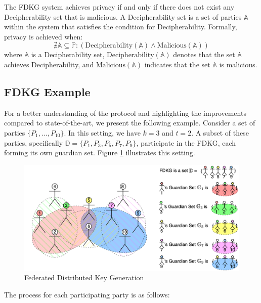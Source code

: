 \documentclass{article}
\begin{document}
\begin{definition}[Privacy] \label{def:privacy}
    The FDKG system achieves privacy if and only if there does not exist any Decipherability set that is malicious. A Decipherability set is a set of parties \( \mathbb{A} \) within the system that satisfies the condition for Decipherability. Formally, privacy is achieved when:
    \[
    \nexists \mathbb{A} \subseteq \mathbb{P} : (\text{Decipherability}(\mathbb{A}) \land \text{Malicious}(\mathbb{A}))
    \]
    where \( \mathbb{A} \) is a Decipherability set, \( \text{Decipherability}(\mathbb{A}) \) denotes that the set \( \mathbb{A} \) achieves Decipherability, and \( \text{Malicious}(\mathbb{A}) \) indicates that the set \( \mathbb{A} \) is malicious.
\end{definition}


\subsection{FDKG Example}

For a better understanding of the protocol and highlighting the improvements compared to state-of-the-art, we present the following example. Consider a set of parties $\{P_1, \ldots, P_{10}\}$. In this setting, we have $k = 3$ and $t = 2$. A subset of these parties, specifically $\mathbb{D} = \{P_1, P_3, P_5, P_7, P_9\}$, participate in the FDKG, each forming its own guardian set. Figure \ref{fig:FDKG} illustrates this setting.

\begin{figure}
    \centering
    \includegraphics[width=\textwidth]{FDKG2.png}
    \caption{Federated Distributed Key Generation}
    \label{fig:FDKG}
\end{figure}

The process for each participating party is as follows:
\end{document}

